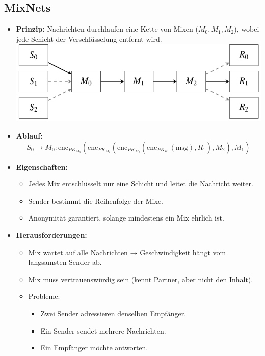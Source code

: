 \subsection{MixNets}
\begin{itemize}
    \item \textbf{Prinzip:} Nachrichten durchlaufen eine Kette von Mixen (\(M_0, M_1, M_2\)), wobei jede Schicht der Verschlüsselung entfernt wird.
      \includegraphics[width=.7\columnwidth]{Resources/mixes.png}
    \item \textbf{Ablauf:} 
    \[
    S_0 \to M_0: \text{enc}_{PK_{M_0}}(\text{enc}_{PK_{M_1}}(\text{enc}_{PK_{M_2}}(\text{enc}_{PK_{R_1}}(\text{msg}), R_1), M_2), M_1)
    \]
    \item \textbf{Eigenschaften:}
    \begin{itemize}
        \item Jedes Mix entschlüsselt nur eine Schicht und leitet die Nachricht weiter.
        \item Sender bestimmt die Reihenfolge der Mixe.
        \item Anonymität garantiert, solange mindestens ein Mix ehrlich ist.
    \end{itemize}
    \item \textbf{Herausforderungen:}
    \begin{itemize}
        \item Mix wartet auf alle Nachrichten → Geschwindigkeit hängt vom langsamsten Sender ab.
        \item Mix muss vertrauenswürdig sein (kennt Partner, aber nicht den Inhalt).
        \item Probleme:
        \begin{itemize}
            \item Zwei Sender adressieren denselben Empfänger.
            \item Ein Sender sendet mehrere Nachrichten.
            \item Ein Empfänger möchte antworten.
        \end{itemize}
    \end{itemize}
\end{itemize}

